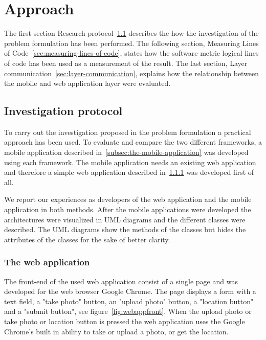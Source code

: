 \chapter{Approach} \label{ch:approach}
The first section Research protocol~\ref{sec:investigation-protocol} describes the how the investigation of the problem formulation has been performed. The following section, Measuring Lines of Code~\ref{sec:measuring-lines-of-code}, states how the software metric logical lines of code has been used as a measurement of the result. The last section, Layer communication~\ref{sec:layer-communication}, explains how the relationship between the mobile and web application layer were evaluated. 


\section{Investigation protocol} \label{sec:investigation-protocol}
To carry out the investigation proposed in the problem formulation a practical approach has been used. To evaluate and compare the two different frameworks, a mobile application described in~\ref{subsec:the-mobile-application} was developed using each framework. The mobile application needs an existing web application and therefore a simple web application described in~\ref{subsec:the-web-application} was developed first of all.

We report our experiences as developers of the web application and the mobile application in both methods. After the mobile applications were developed the architectures were visualized in UML diagrams and the different classes were described. The UML diagrams show the methods of the classes but hides the attributes of the classes for the sake of better clarity. 

\subsection{The web application} \label{subsec:the-web-application}
The front-end of the used web application consist of a single page and was developed for the web browser Google Chrome. The page displays a form with a text field, a "take photo" button, an "upload photo" button, a "location button" and a "submit button", see figure~\ref{fig:webappfront}. When the upload photo or take photo or location button is pressed the web application uses the Google Chrome’s built in ability to take or upload a photo,	 or get the location.

